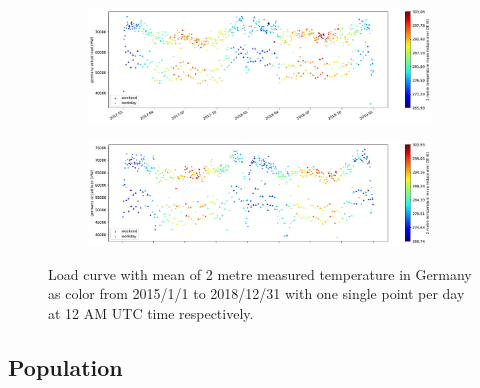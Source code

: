 
\begin{figure}[H]%
	\centering
	\begin{subfigure}{.5\textwidth}
		\centering
		\includegraphics[width=2.9\textwidth,angle=-90,origin=c]{plots/plot_load_time_func/t2m_mean_18A5_2017010112_2018123112_24F}%
		\label{fig:t2m_mean_18A5_2017010112_2018123112_24F}%
	\end{subfigure}%
	\begin{subfigure}{.5\textwidth}
		\centering
		\includegraphics[width=2.9\textwidth,angle=-90,origin=c]{plots/plot_load_time_func/t2m_mean_18A5_2015010112_2016123112_24F}%
		\label{fig:t2m_mean_18A5_2015010112_2016123112_24F}%
	\end{subfigure}
	\caption{Load curve with mean of 2 metre measured temperature in Germany as color from 2015/1/1 to 2018/12/31 with one single point per day at 12 AM UTC time respectively.}
	\label{fig:t2m_mean_18A5_twofold_24F}
\end{figure}


\subsection{Population}


